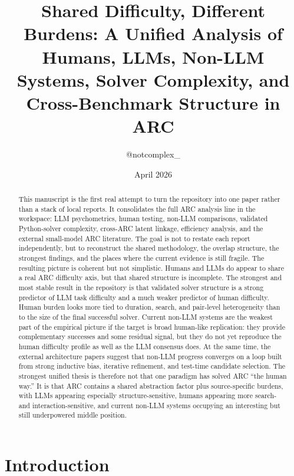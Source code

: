 \documentclass[11pt,letterpaper]{article}
\title{\textbf{Shared Difficulty, Different Burdens: A Unified Analysis of Humans, LLMs, Non-LLM Systems, Solver Complexity, and Cross-Benchmark Structure in ARC}}
\author{@notcomplex\_}
\date{April 2026}
\begin{document}
\maketitle

\begin{abstract}
This manuscript is the first real attempt to turn the repository into one paper rather than a stack of local reports. It consolidates the full ARC analysis line in the workspace: LLM psychometrics, human testing, non-LLM comparisons, validated Python-solver complexity, cross-ARC latent linkage, efficiency analysis, and the external small-model ARC literature. The goal is not to restate each report independently, but to reconstruct the shared methodology, the overlap structure, the strongest findings, and the places where the current evidence is still fragile. The resulting picture is coherent but not simplistic. Humans and LLMs do appear to share a real ARC difficulty axis, but that shared structure is incomplete. The strongest and most stable result in the repository is that validated solver structure is a strong predictor of LLM task difficulty and a much weaker predictor of human difficulty. Human burden looks more tied to duration, search, and pair-level heterogeneity than to the size of the final successful solver. Current non-LLM systems are the weakest part of the empirical picture if the target is broad human-like replication: they provide complementary successes and some residual signal, but they do not yet reproduce the human difficulty profile as well as the LLM consensus does. At the same time, the external architecture papers suggest that non-LLM progress converges on a loop built from strong inductive bias, iterative refinement, and test-time candidate selection. The strongest unified thesis is therefore not that one paradigm has solved ARC ``the human way.'' It is that ARC contains a shared abstraction factor plus source-specific burdens, with LLMs appearing especially structure-sensitive, humans appearing more search- and interaction-sensitive, and current non-LLM systems occupying an interesting but still underpowered middle position.
\end{abstract}

\tableofcontents
\clearpage

\section{Introduction}
\end{document}
